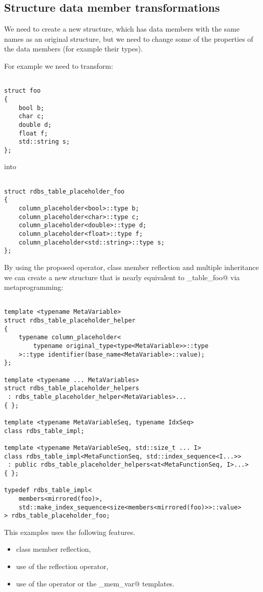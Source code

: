 \subsection{Structure data member transformations}

We need to create a new structure, which has data members with the same names
as an original structure, but we need to change some of the properties
of the data members (for example their types).

For example we need to transform:

\begin{verbatim}

struct foo
{
	bool b;
	char c;
	double d;
	float f;
	std::string s;
};

\end{verbatim}

into

\begin{verbatim}

struct rdbs_table_placeholder_foo
{
	column_placeholder<bool>::type b;
	column_placeholder<char>::type c;
	column_placeholder<double>::type d;
	column_placeholder<float>::type f;
	column_placeholder<std::string>::type s;
};

\end{verbatim}

By using the proposed \verb@identifier@ operator, class member reflection
and multiple inheritance we can create a new structure that is
nearly equivalent to \verb@rdbs_table_foo@ via metaprogramming:

\begin{verbatim}

template <typename MetaVariable>
struct rdbs_table_placeholder_helper
{
	typename column_placeholder<
		typename original_type<type<MetaVariable>>::type
	>::type identifier(base_name<MetaVariable>::value);
};

template <typename ... MetaVariables>
struct rdbs_table_placeholder_helpers
 : rdbs_table_placeholder_helper<MetaVariables>...
{ };

template <typename MetaVariableSeq, typename IdxSeq>
class rdbs_table_impl;

template <typename MetaVariableSeq, std::size_t ... I>
class rdbs_table_impl<MetaFunctionSeq, std::index_sequence<I...>>
 : public rdbs_table_placeholder_helpers<at<MetaFunctionSeq, I>...>
{ };

typedef rdbs_table_impl<
	members<mirrored(foo)>,
	std::make_index_sequence<size<members<mirrored(foo)>>::value>
> rdbs_table_placeholder_foo;

\end{verbatim}

This examples uses the following features.

\begin{itemize}
\item{class member reflection,}
\item{use of the reflection operator,}
\item{use of the \verb@identifier@ operator or the \verb@named_mem_var@ templates.}
\end{itemize}

